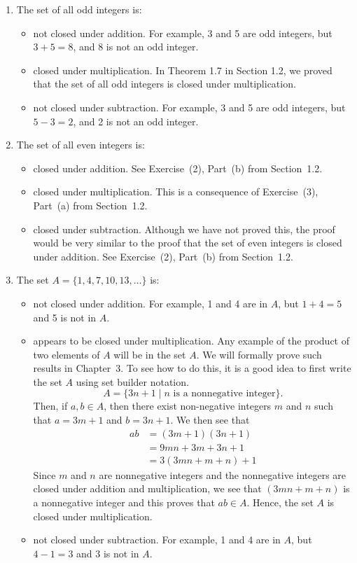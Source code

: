 \documentclass[11pt]{article}
\begin{document}
\begin{enumerate}
  \item The set of all odd integers is:
\begin{itemize}
\item not closed under addition.  For example, 3 and 5 are odd integers, but 
$3 + 5 = 8$, and 8 is not an odd integer.  
\item closed under multiplication.  In Theorem 1.7 in Section 1.2, we proved that the set of all odd integers is closed under multiplication.
\item not closed under subtraction.  For example, 3 and 5 are odd integers, but 
$5 - 3 = 2$, and 2 is not an odd integer.
\end{itemize}

  \item The set of all even integers is:
\begin{itemize}
\item closed under addition.  See Exercise~(2), Part~(b) from Section~1.2.
\item closed under multiplication.  This is a consequence of Exercise~(3), Part~(a) from Section~1.2.
\item closed under subtraction.  Although we have not proved this, the proof would be very similar to the proof that the set of even integers is closed under addition.  See Exercise~(2), Part~(b) from Section~1.2.
\end{itemize}

  \item The set $A = \{1, 4, 7, 10, 13, \ldots \}$ is:
\begin{itemize}
\item not closed under addition.  For example, 1 and 4 are in $A$, but $1 + 4 = 5$ and 5 is not in $A$.
\item appears to be closed under multiplication.  Any example of the product of two elements of $A$ will be in the set $A$.  We will formally prove such results in Chapter~3.  To see how to do this, it is a good idea to first write the set $A$ using set builder notation.
\[
A = \{ 3n + 1 \mid n \text{ is a nonnegative integer} \}.
\]
Then, if $a, b \in A$, then there exist non-negative integers $m$ and $n$ such that $a = 3m + 1$ and $b = 3n + 1$.  We then see that
\begin{align*}
ab &= (3m + 1)(3n + 1) \\
   &= 9mn + 3m + 3n + 1 \\
   &= 3(3mn + m + n) + 1
\end{align*}
Since $m$ and $n$ are nonnegative integers and the nonnegative integers are closed under addition and multiplication, we see that $(3mn + m + n)$ is a nonnegative integer and this proves that $ab \in A$.  Hence, the set $A$ is closed under multiplication.
\item not closed under subtraction.  For example, 1 and 4 are in $A$, but $4 -1 = 3$ and 3 is not in $A$.
\end{itemize}


\end{enumerate}
\end{document}

